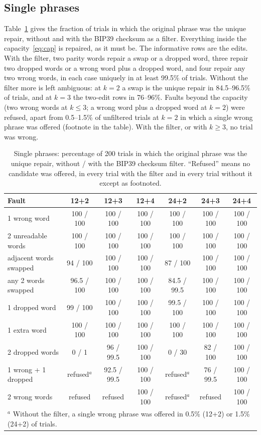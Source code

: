 \documentclass[numeric]{anvil-paper}
\begin{document}
\subsection{Single phrases}

Table~\ref{tab:single} gives the fraction of trials in which the original
phrase was the unique repair, without and with the BIP39 checksum as a filter.
Everything inside the capacity~\eqref{eq:cap} is repaired, as it must be. The
informative rows are the edits. With the filter, two parity words repair a
swap or a dropped word, three repair two dropped words or a wrong word plus a
dropped word, and four repair any two wrong words, in each case uniquely in at
least 99.5\% of trials. Without the filter more is left ambiguous: at $k=2$ a
swap is the unique repair in 84.5--96.5\% of trials, and at $k=3$ the
two-edit rows in 76--96\%. Faults beyond the capacity
(two wrong words at $k\le3$; a wrong word plus a dropped word at $k=2$) were
refused, apart from 0.5--1.5\% of unfiltered trials at $k=2$ in which a single
wrong phrase was offered (footnote in the table). With the filter, or with
$k\ge 3$, no trial was wrong.

\begin{table}[!htb]
\centering
\caption{Single phrases: percentage of 200 trials in which the original phrase
was the unique repair, without / with the BIP39 checksum filter. ``Refused''
means no candidate was offered, in every trial with the filter and in every
trial without it except as footnoted.}
\label{tab:single}
\small
\begin{tabular}{lcccccc}
\toprule
Fault & 12+2 & 12+3 & 12+4 & 24+2 & 24+3 & 24+4 \\
\midrule
1 wrong word & 100 / 100 & 100 / 100 & 100 / 100 & 100 / 100 & 100 / 100 & 100 / 100 \\
2 unreadable words & 100 / 100 & 100 / 100 & 100 / 100 & 100 / 100 & 100 / 100 & 100 / 100 \\
adjacent words swapped & 94 / 100 & 100 / 100 & 100 / 100 & 87 / 100 & 100 / 100 & 100 / 100 \\
any 2 words swapped & 96.5 / 100 & 100 / 100 & 100 / 100 & 84.5 / 99.5 & 100 / 100 & 100 / 100 \\
1 dropped word & 99 / 100 & 100 / 100 & 100 / 100 & 99.5 / 100 & 100 / 100 & 100 / 100 \\
1 extra word & 100 / 100 & 100 / 100 & 100 / 100 & 100 / 100 & 100 / 100 & 100 / 100 \\
2 dropped words & 0 / 1 & 96 / 99.5 & 100 / 100 & 0 / 30 & 82 / 100 & 100 / 100 \\
1 wrong + 1 dropped & refused$^{a}$ & 92.5 / 99.5 & 100 / 100 & refused$^{a}$ & 76 / 99.5 & 100 / 100 \\
2 wrong words & refused & refused & 100 / 100 & refused$^{a}$ & refused & 100 / 100 \\
\bottomrule
\multicolumn{7}{l}{\footnotesize $^{a}$ Without the filter, a single wrong phrase
was offered in 0.5\% (12+2) or 1.5\% (24+2) of trials.}
\end{tabular}
\end{table}
\end{document}
